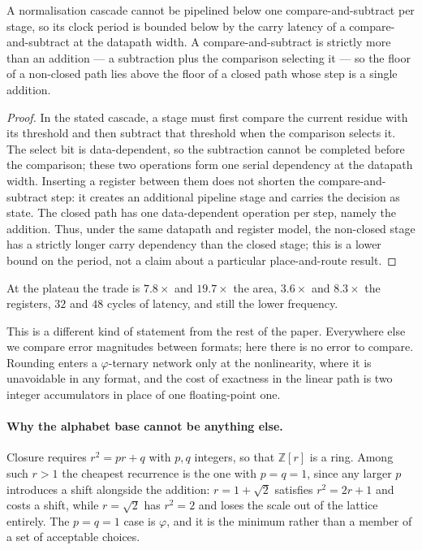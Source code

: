 \begin{theorem}\label{thm:normfloor}
A normalisation cascade cannot be pipelined below one compare-and-subtract per
stage, so its clock period is bounded below by the carry latency of a
compare-and-subtract at the datapath width. A compare-and-subtract is strictly
more than an addition --- a subtraction plus the comparison selecting it --- so
the floor of a non-closed path lies above the floor of a closed path whose step
is a single addition.
\end{theorem}
\begin{proof}
In the stated cascade, a stage must first compare the current residue with its
threshold and then subtract that threshold when the comparison selects it.
The select bit is data-dependent, so the subtraction cannot be completed before
the comparison; these two operations form one serial dependency at the
datapath width. Inserting a register between them does not shorten the
compare-and-subtract step: it creates an additional pipeline stage and carries
the decision as state. The closed path has one data-dependent operation per
step, namely the addition. Thus, under the same datapath and register model,
the non-closed stage has a strictly longer carry dependency than the closed
stage; this is a lower bound on the period, not a claim about a particular
place-and-route result.
\end{proof}

At the plateau the trade is $7.8\times$ and $19.7\times$ the area,
$3.6\times$ and $8.3\times$ the registers, $32$ and $48$ cycles of latency, and
still the lower frequency.


This is a different kind of statement from the rest of the paper. Everywhere else
we compare error magnitudes between formats; here there is no error to compare.
Rounding enters a $\varphi$-ternary network only at the nonlinearity, where it is
unavoidable in any format, and the cost of exactness in the linear path is two
integer accumulators in place of one floating-point one.

\paragraph{Why the alphabet base cannot be anything else.} Closure requires
$r^{2} = pr + q$ with $p,q$ integers, so that $\mathbb{Z}[r]$ is a ring. Among
such $r>1$ the cheapest recurrence is the one with $p=q=1$, since any larger $p$
introduces a shift alongside the addition: $r = 1+\sqrt2$ satisfies
$r^2 = 2r+1$ and costs a shift, while $r=\sqrt2$ has $r^2 = 2$ and loses the
scale out of the lattice entirely. The $p=q=1$ case is $\varphi$, and it is the
minimum rather than a member of a set of acceptable choices.

